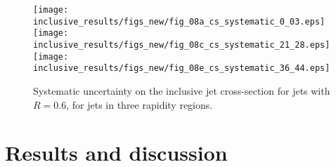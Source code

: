 \begin{figure}
\begin{centering}
\texttt{[image: inclusive\_results/figs\_new/fig\_08a\_cs\_systematic\_0\_03.eps]}
\texttt{[image: inclusive\_results/figs\_new/fig\_08c\_cs\_systematic\_21\_28.eps]}
\texttt{[image: inclusive\_results/figs\_new/fig\_08e\_cs\_systematic\_36\_44.eps]}
\end{centering}
\caption[Inclusive jet cross-section systematic uncertainty]{Systematic uncertainty on the inclusive jet cross-section for \akt jets with $R=0.6$, for jets in three rapidity regions.}
\label{fig_systematics}
\end{figure}



\section{Results and discussion}
\label{sec::results}

